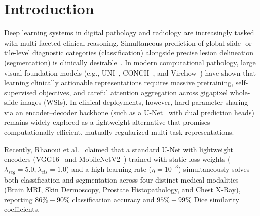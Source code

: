 \documentclass[runningheads]{llncs}
\begin{document}
\section{Introduction}
Deep learning systems in digital pathology and radiology are increasingly tasked with multi-faceted clinical reasoning. Simultaneous prediction of global slide- or tile-level diagnostic categories (classification) alongside precise lesion delineation (segmentation) is clinically desirable~\cite{litjens2017survey,campanella2019clinical}. In modern computational pathology, large visual foundation models (e.g., UNI~\cite{chen2024uni}, CONCH~\cite{lu2024conch}, and Virchow~\cite{vorontsov2024virchow}) have shown that learning clinically actionable representations requires massive pretraining, self-supervised objectives, and careful attention aggregation across gigapixel whole-slide images (WSIs). In clinical deployments, however, hard parameter sharing via an encoder--decoder backbone (such as a U-Net~\cite{ronneberger2015u} with dual prediction heads) remains widely explored as a lightweight alternative that promises computationally efficient, mutually regularized multi-task representations.

Recently, Rhanoui et al.~\cite{rhanoui2025multitask} claimed that a standard U-Net with lightweight encoders (VGG16~\cite{simonyan2014very} and MobileNetV2~\cite{sandler2018mobilenetv2}) trained with static loss weights ($\lambda_{seg}=5.0, \lambda_{cls}=1.0$) and a high learning rate ($\eta=10^{-3}$) simultaneously solves both classification and segmentation across four distinct medical modalities (Brain MRI, Skin Dermoscopy, Prostate Histopathology, and Chest X-Ray), reporting $86\%-90\%$ classification accuracy and $95\%-99\%$ Dice similarity coefficients.
\end{document}
